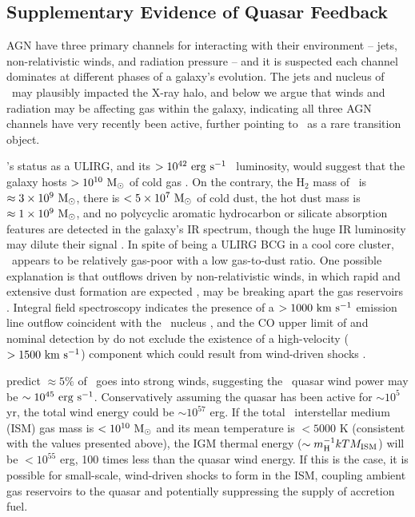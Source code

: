 \documentclass[useAMS,usenatbib]{mn2e}
\begin{document}
\subsection{Supplementary Evidence of Quasar Feedback}

AGN have three primary channels for interacting with their environment
-- jets, non-relativistic winds, and radiation pressure -- and it is
suspected each channel dominates at different phases of a galaxy's
evolution. The jets and nucleus of \irs\ may plausibly impacted the
X-ray halo, and below we argue that winds and radiation may be
affecting gas within the galaxy, indicating all three AGN channels
have very recently been active, further pointing to \irs\ as a rare
transition object.

\irs's status as a ULIRG, and its $> 10^{42} ~\rm{\mbox{\ensuremath{\rm{erg}}}~\ensuremath{\rm{\mbox{\ensuremath{\rm{s}}}^{-1}}}}$
\halpha\ luminosity, would suggest that the galaxy hosts $> 10^{10}
~\rm{M_{\odot}}$ of cold gas \citep[\eg][]{1988ApJ...325...74S, edge01}. On the
contrary, the H$_2$ mass of \irs\ is $\approx 3 \times 10^{9} ~\rm{M_{\odot}}$,
there is $< 5 \times 10^7 ~\rm{M_{\odot}}$ of cold dust, the hot dust mass is
$\approx 1 \times 10^9 ~\rm{M_{\odot}}$, and no polycyclic aromatic hydrocarbon
or silicate absorption features are detected in the galaxy's IR
spectrum, though the huge IR luminosity may dilute their signal
\citep{1997A&A...318L...1T, 2004ApJ...613..986P, 2008ApJ...683..114S,
  2010arXiv1009.2040C}. In spite of being a ULIRG BCG in a cool core
cluster, \irs\ appears to be relatively gas-poor with a low
gas-to-dust ratio. One possible explanation is that outflows driven by
non-relativistic winds, in which rapid and extensive dust formation
are expected \citep{2002ApJ...567L.107E}, may be breaking apart the
gas reservoirs \citep[\eg][]{2010MNRAS.401....7H}. Integral field
spectroscopy indicates the presence of a $> 1000 ~\rm{\mbox{\ensuremath{\rm{km}}}~\ensuremath{\rm{\mbox{\ensuremath{\rm{s}}}^{-1}}}}$ emission line
outflow coincident with the \irs\ nucleus \citep{1996MNRAS.283.1003C},
and the CO upper limit of \citet{1998ApJ...506..205E} and nominal
detection by \citet{2010arXiv1009.2040C} do not exclude the existence
of a high-velocity ($> 1500 ~\rm{\mbox{\ensuremath{\rm{km}}}~\ensuremath{\rm{\mbox{\ensuremath{\rm{s}}}^{-1}}}}$) component which could result from
wind-driven shocks \citep[\eg][]{2010A&A...518L.155F}.  

\citet{2005ApJ...619...60L} predict $\approx 5\%$ of \lqso\ goes into
strong winds, suggesting the \irs\ quasar wind power may be $\sim
10^{45} ~\rm{\mbox{\ensuremath{\rm{erg}}}~\ensuremath{\rm{\mbox{\ensuremath{\rm{s}}}^{-1}}}}$. Conservatively assuming the quasar has been active for
$\sim 10^5$ yr, the total wind energy could be $\sim 10^{57}$ erg. If
the total \irs\ interstellar medium (ISM) gas mass is $< 10^{10}
~\rm{M_{\odot}}$ and its mean temperature is $< 5000$ K (consistent with the
values presented above), the IGM thermal energy ($\sim m_{\rm{H}}^{-1} kT
M_{\rm{ISM}}$) will be $< 10^{55}$ erg, 100 times less than the quasar
wind energy. If this is the case, it is possible for small-scale,
wind-driven shocks to form in the ISM, coupling ambient gas reservoirs
to the quasar and potentially suppressing the supply of accretion
fuel.
\end{document}
